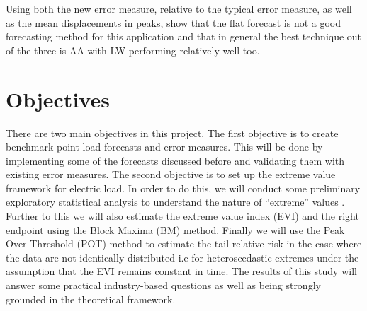 Using both the new error measure, relative to the typical error measure, as well as the mean displacements in peaks, \cite{dan14} show that the flat forecast is not a good forecasting method for this application and that in general the best technique out of the three is AA with LW performing relatively well too.


\section{Objectives} \label{subsec:objectives}

There are two main objectives in this project. The first objective is to create benchmark point load forecasts and error measures. This will be done by implementing some of the forecasts discussed before and validating them with existing error measures. The second objective is to set up the extreme value framework for electric load. In order to do this, we will conduct some preliminary exploratory statistical analysis to understand the nature of ``extreme'' values . Further to this we will also estimate the extreme value index (EVI) and the right endpoint using the Block Maxima (BM) method. Finally we will use the Peak Over Threshold (POT) method to estimate the tail relative risk in the case where the data are not identically distributed i.e for heteroscedastic extremes under the assumption that the EVI remains constant in time. The results of this study will answer some practical industry-based questions as well as being strongly grounded in the theoretical framework.